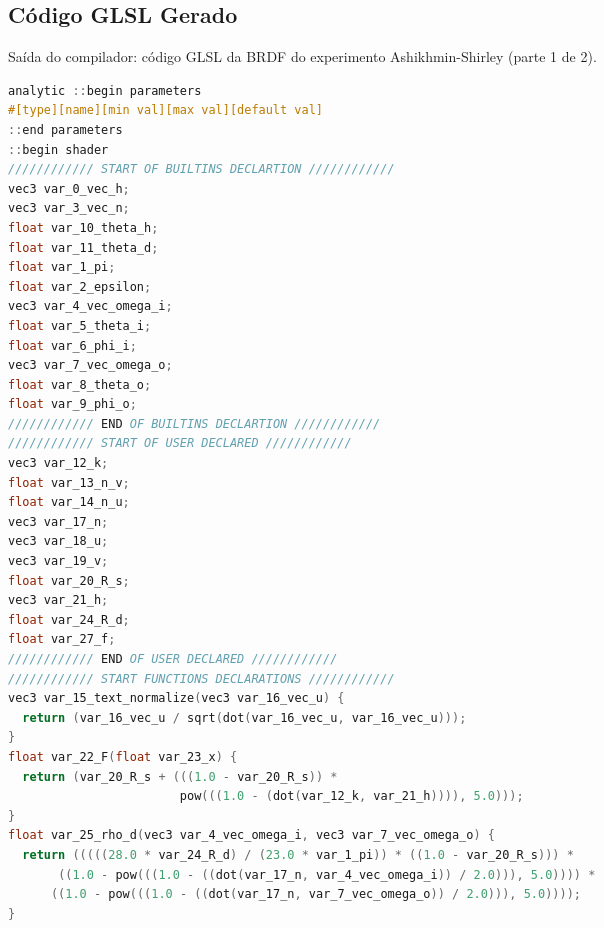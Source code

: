 \subsection{Código GLSL Gerado}
\begin{codigo}[H]
    \caption{\small Saída do compilador: código GLSL da BRDF do experimento Ashikhmin-Shirley (parte 1 de 2).}
    \label{cod-ashikhmin-shirley-close-to-original-glsl-pt-1}
\begin{lstlisting}[language=C, inputencoding=utf8]
analytic ::begin parameters
#[type][name][min val][max val][default val]
::end parameters
::begin shader
//////////// START OF BUILTINS DECLARTION ////////////
vec3 var_0_vec_h;
vec3 var_3_vec_n;
float var_10_theta_h;
float var_11_theta_d;
float var_1_pi;
float var_2_epsilon;
vec3 var_4_vec_omega_i;
float var_5_theta_i;
float var_6_phi_i;
vec3 var_7_vec_omega_o;
float var_8_theta_o;
float var_9_phi_o;
//////////// END OF BUILTINS DECLARTION ////////////
//////////// START OF USER DECLARED ////////////
vec3 var_12_k;
float var_13_n_v;
float var_14_n_u;
vec3 var_17_n;
vec3 var_18_u;
vec3 var_19_v;
float var_20_R_s;
vec3 var_21_h;
float var_24_R_d;
float var_27_f;
//////////// END OF USER DECLARED ////////////
//////////// START FUNCTIONS DECLARATIONS ////////////
vec3 var_15_text_normalize(vec3 var_16_vec_u) {
  return (var_16_vec_u / sqrt(dot(var_16_vec_u, var_16_vec_u)));
}
float var_22_F(float var_23_x) {
  return (var_20_R_s + (((1.0 - var_20_R_s)) *
                        pow(((1.0 - (dot(var_12_k, var_21_h)))), 5.0)));
}
float var_25_rho_d(vec3 var_4_vec_omega_i, vec3 var_7_vec_omega_o) {
  return (((((28.0 * var_24_R_d) / (23.0 * var_1_pi)) * ((1.0 - var_20_R_s))) *
       ((1.0 - pow(((1.0 - ((dot(var_17_n, var_4_vec_omega_i)) / 2.0))), 5.0)))) *
      ((1.0 - pow(((1.0 - ((dot(var_17_n, var_7_vec_omega_o)) / 2.0))), 5.0))));
}
\end{lstlisting}
\end{codigo}

